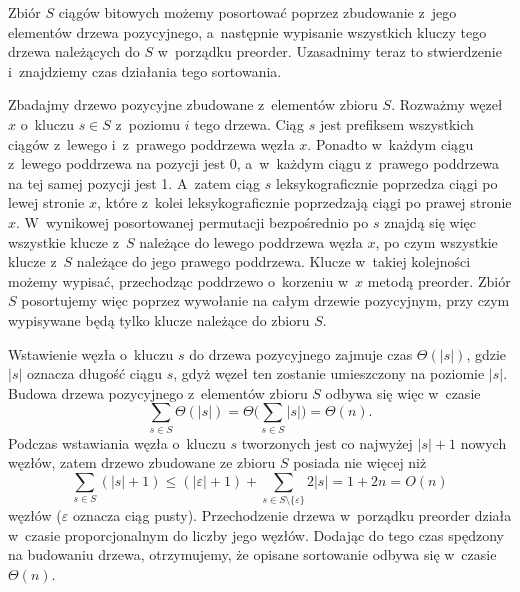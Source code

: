 
\noindent Zbiór $S$ ciągów bitowych możemy posortować poprzez zbudowanie z~jego elementów drzewa pozycyjnego, a~następnie wypisanie wszystkich kluczy tego drzewa należących do $S$ w~porządku preorder.
Uzasadnimy teraz to stwierdzenie i~znajdziemy czas działania tego sortowania.

Zbadajmy drzewo pozycyjne zbudowane z~elementów zbioru $S$.
Rozważmy węzeł $x$ o~kluczu $s\in S$ z~poziomu $i$ tego drzewa.
Ciąg $s$ jest  prefiksem wszystkich ciągów z~lewego i~z~prawego poddrzewa węzła $x$.
Ponadto w~każdym ciągu z~lewego poddrzewa na  pozycji jest 0, a~w~każdym ciągu z~prawego poddrzewa na tej samej pozycji jest 1.
A~zatem ciąg $s$ leksykograficznie poprzedza ciągi po lewej stronie $x$, które z~kolei leksykograficznie poprzedzają ciągi po prawej stronie $x$.
W~wynikowej posortowanej permutacji bezpośrednio po $s$ znajdą się więc wszystkie klucze z~$S$ należące do lewego poddrzewa węzła $x$, po czym wszystkie klucze z~$S$ należące do jego prawego poddrzewa.
Klucze w~takiej kolejności możemy wypisać, przechodząc poddrzewo o~korzeniu w~$x$ metodą preorder.
Zbiór $S$ posortujemy więc poprzez wywołanie  na całym drzewie pozycyjnym, przy czym wypisywane będą tylko klucze należące do zbioru $S$.

Wstawienie węzła o~kluczu $s$ do drzewa pozycyjnego zajmuje czas $\Theta(|s|)$, gdzie $|s|$ oznacza długość ciągu $s$, gdyż węzeł ten zostanie umieszczony na poziomie $|s|$.
Budowa drzewa pozycyjnego z~elementów zbioru $S$ odbywa się więc w~czasie
\[
	\sum_{s\in S}\Theta(|s|) = \Theta\biggl(\sum_{s\in S}|s|\biggr) = \Theta(n).
\]
Podczas wstawiania węzła o~kluczu $s$ tworzonych jest co najwyżej $|s|+1$ nowych węzłów, zatem drzewo zbudowane ze zbioru $S$ posiada nie więcej niż
\[
	\sum_{s\in S}(|s|+1) \le (|\varepsilon|+1)+\sum_{s\in S\setminus\{\varepsilon\}}2|s| = 1+2n = O(n)
\]
węzłów ($\varepsilon$ oznacza ciąg pusty).
Przechodzenie drzewa w~porządku preorder działa w~czasie proporcjonalnym do liczby jego węzłów.
Dodając do tego czas spędzony na budowaniu drzewa, otrzymujemy, że opisane sortowanie odbywa się w~czasie $\Theta(n)$.



